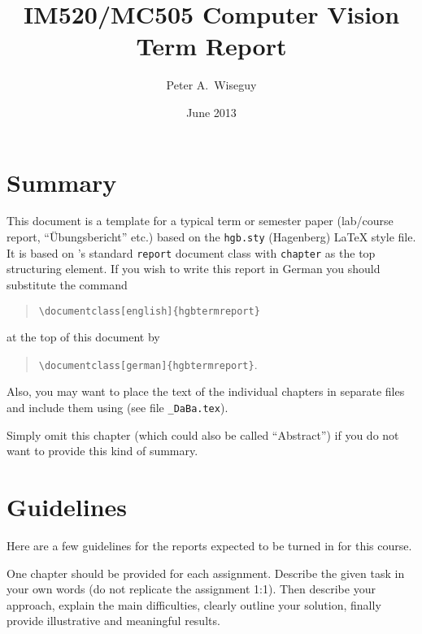 \documentclass[english,11pt]{report}
\author{Peter A.\ Wiseguy}
\title{IM520/MC505 Computer Vision \\ Term Report}
\date{June 2013}
\begin{document}
\maketitle
\tableofcontents

\chapter*{Summary}

This document is a template for a typical term or semester paper (lab/course report, 
``Übungsbericht'' etc.) based on the \texttt{hgb.sty} (Hagenberg) LaTeX style file.
It is based on \latex's standard \texttt{report} document class with \texttt{chapter} as the top 
structuring element.
If you wish to write this report in German you should substitute the command
\begin{quote}
 \verb!\documentclass[english]{hgbtermreport}! 
\end{quote}
at the top of this document by
\begin{quote}
 \verb!\documentclass[german]{hgbtermreport}!.
\end{quote}
Also, you may want to place the text of the individual chapters in separate files and 
include them using \verb!! 
(see file \verb!_DaBa.tex!).

Simply omit this chapter (which could also be called ``Abstract'') if you do not want to provide this kind of summary.


\chapter{Guidelines}

Here are a few guidelines for the reports expected to be turned in for this course.

One chapter should be provided for each assignment.
Describe the given task in your own words (do not replicate the assignment 1:1). 
Then describe your approach, explain the main difficulties, clearly outline your solution, finally provide illustrative and meaningful results. 
\end{document}
